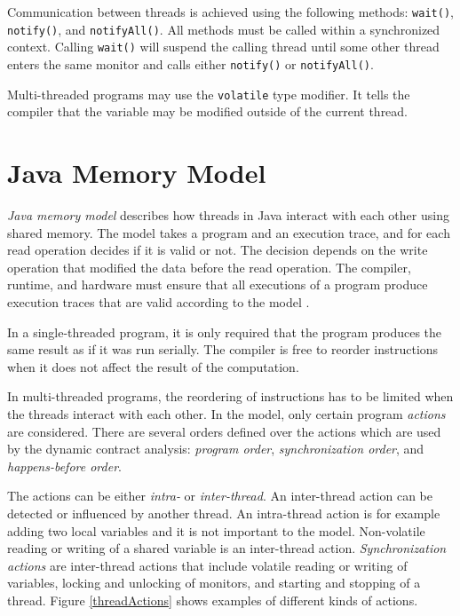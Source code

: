 Communication between threads is achieved using the following methods:
\texttt{wait()}, \texttt{notify()}, and \texttt{notifyAll()}. All methods must
be called within a synchronized context. Calling \texttt{wait()} will suspend
the calling thread until some other thread enters the same monitor and calls
either \texttt{notify()} or \texttt{notifyAll()}.

Multi-threaded programs may use the \texttt{volatile} type modifier. It tells
the compiler that the variable may be modified outside of the current thread.

\section{Java Memory Model}


\emph{Java memory model} describes how threads in Java interact with each other
using shared memory. The model takes a program and an execution trace, and for
each read operation decides if it is valid or not. The decision depends on the
write operation that modified the data before the read operation. The compiler,
runtime, and hardware must ensure that all executions of a program produce
execution traces that are valid according to the model \cite{jmmspec}.

In a single-threaded program, it is only required that the program produces the
same result as if it was run serially. The compiler is free to reorder
instructions when it does not affect the result of the computation.

In multi-threaded programs, the reordering of instructions has to be limited
when the threads interact with each other. In the model, only certain program
\emph{actions} are considered. There are several orders defined over the actions
which are used by the dynamic contract analysis: \emph{program order},
\emph{synchronization order}, and \emph{happens-before order}.

The actions can be either \emph{intra-} or \emph{inter-thread}. An inter-thread
action can be detected or influenced by another thread. An intra-thread action
is for example adding two local variables and it is not important to the model.
Non-volatile reading or writing of a shared variable is an inter-thread action.
\emph{Synchronization actions} are inter-thread actions that include volatile
reading or writing of variables, locking and unlocking of monitors, and starting
and stopping of a thread. Figure \ref{threadActions} shows examples of different
kinds of actions.

